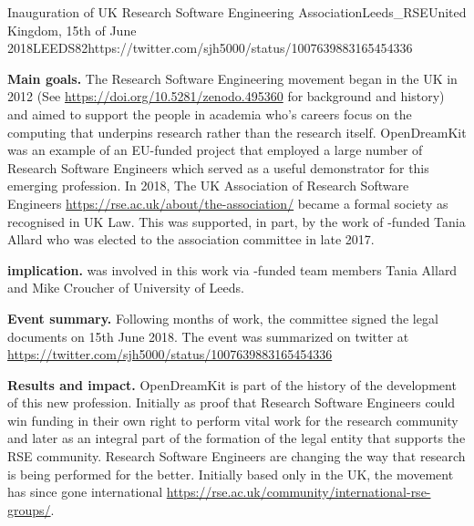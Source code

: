 \begin{event}{Inauguration of UK Research Software Engineering Association}{Leeds_RSE}{United Kingdom, 15th of June 2018}{LEEDS}{8}{2}{https://twitter.com/sjh5000/status/1007639883165454336}

\textbf{Main goals.} The Research Software Engineering movement began in the UK in 2012 (See \url{https://doi.org/10.5281/zenodo.495360} for background and history) and aimed to support the people in academia who's careers focus on the computing that underpins research rather than the research itself. OpenDreamKit was an example of an EU-funded project that employed a large number of Research Software Engineers which served as a useful demonstrator for this emerging profession. In 2018, The UK Association of Research Software Engineers \url{https://rse.ac.uk/about/the-association/} became a formal society as recognised in UK Law. This was supported, in part, by the work of \ODK-funded Tania Allard who was elected to the association committee in late 2017.

\textbf{\ODK implication.} \ODK was involved in this work via \ODK-funded team members Tania Allard and Mike Croucher of University of Leeds.

\textbf{Event summary.} Following months of work, the committee signed the legal documents on 15th June 2018. The event was summarized on twitter at \url{https://twitter.com/sjh5000/status/1007639883165454336}

\textbf{Results and impact.} OpenDreamKit is part of the history of the development of this new profession. Initially as proof that Research Software Engineers could win funding in their own right to perform vital work for the research community and later as an integral part of the formation of the legal entity that supports the RSE community.  Research Software Engineers are changing the way that research is being performed for the better. Initially based only in the UK, the movement has since gone international \url{https://rse.ac.uk/community/international-rse-groups/}.

\end{event}
